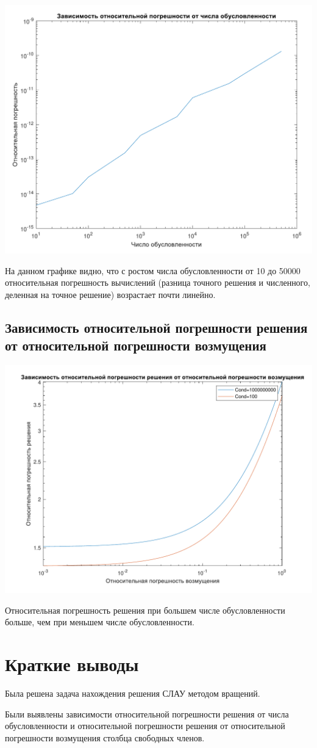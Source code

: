 \includegraphics[scale=0.5]{1.pdf}

На данном графике видно, что с ростом числа обусловленности от 10 до 50000 относительная погрешность вычислений (разница точного решения и численного, деленная на точное решение) возрастает почти линейно. 

\subsection{Зависимость относительной погрешности решения от относительной погрешности возмущения}

\includegraphics[scale=0.5]{2.pdf}

Относительная погрешность решения при большем числе обусловленности больше, чем при меньшем числе обусловленности.


\section{Краткие выводы}

Была решена задача нахождения решения СЛАУ методом вращений.

Были выявлены зависимости относительной погрешности решения от числа обусловленности и относительной погрешности решения от относительной погрешности возмущения столбца свободных членов.



